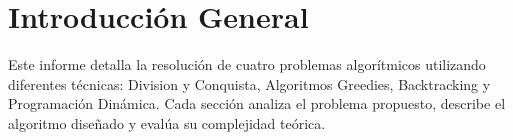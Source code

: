 \section*{Introducción General}

Este informe detalla la resolución de cuatro problemas algorítmicos utilizando diferentes técnicas: Division y Conquista, Algoritmos Greedies, Backtracking y Programación Dinámica. Cada sección analiza el problema propuesto, describe el algoritmo diseñado y evalúa su complejidad teórica.

